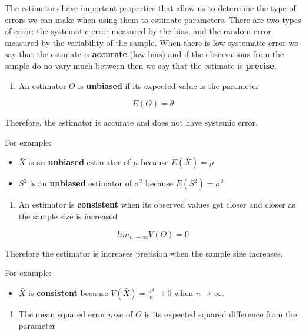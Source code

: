 \documentclass[
]{book}
\providecommand{\tightlist}{%
  \setlength{\itemsep}{0pt}\setlength{\parskip}{0pt}}
\begin{document}
The estimators have important properties that allow us to determine the type of errors we can make when using them to estimate parameters. There are two types of error: the systematic error measured by the bias, and the random error measured by the variability of the sample. When there is low systematic error we say that the estimate is \textbf{accurate} (low bias) and if the observations from the sample do no vary much between then we say that the estimate is \textbf{precise}.

\begin{enumerate}
\def\labelenumi{\arabic{enumi}.}
\tightlist
\item
  An estimator \(\Theta\) is \textbf{unbiased} if its expected value is the parameter
\end{enumerate}

\[E(\Theta)=\theta\]

Therefore, the estimator is accurate and does not have systemic error.

For example:

\begin{itemize}
\item
  \(\bar{X}\) is an \textbf{unbiased} estimator of \(\mu\) because \(E(\bar{X})=\mu\)
\item
  \(S^2\) is an \textbf{unbiased} estimator of \(\sigma^2\) because \(E(S^2)=\sigma^2\)
\end{itemize}

\begin{enumerate}
\def\labelenumi{\arabic{enumi}.}
\setcounter{enumi}{1}
\tightlist
\item
  An estimator is \textbf{consistent} when its observed values get closer and closer as the sample size is increased
\end{enumerate}

\[lim_{n\rightarrow \infty} V(\Theta) = 0\]

Therefore the estimator is increases precision when the sample size increases.

For example:

\begin{itemize}
\tightlist
\item
  \(\bar{X}\) is \textbf{consistent} because \(V(\bar{X})=\frac{\sigma^2}{n}\rightarrow 0\) when \(n \rightarrow \infty\).
\end{itemize}

\begin{enumerate}
\def\labelenumi{\arabic{enumi}.}
\setcounter{enumi}{2}
\tightlist
\item
  The mean squared error \(mse\) of \(\Theta\) is its expected squared difference from the parameter
\end{enumerate}
\end{document}
